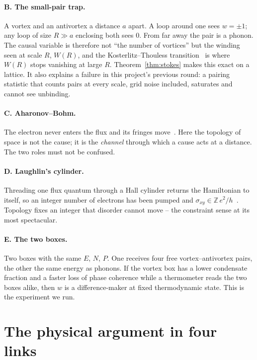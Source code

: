 \documentclass[11pt,a4paper]{article}
\begin{document}
\paragraph{B. The small-pair trap.} A vortex and an antivortex a distance $a$ apart. A loop around one
sees $w=\pm1$; any loop of size $R\gg a$ enclosing both sees $0$. From far away the pair is a
phonon. The causal variable is therefore not ``the number of vortices'' but the winding seen at scale
$R$, $W(R)$, and the Kosterlitz--Thouless transition~\cite{KosterlitzThouless1973} is where $W(R)$
stops vanishing at large $R$. Theorem~\ref{thm:stokes} makes this exact on a lattice. It also explains
a failure in this project's previous round: a pairing statistic that counts pairs at every scale,
grid noise included, saturates and cannot see unbinding.

\paragraph{C. Aharonov--Bohm.} The electron never enters the flux and its fringes
move~\cite{Tonomura1986}. Here the topology of space is not the cause; it is the \emph{channel}
through which a cause acts at a distance. The two roles must not be confused.

\paragraph{D. Laughlin's cylinder.} Threading one flux quantum through a Hall cylinder returns the
Hamiltonian to itself, so an integer number of electrons has been pumped and
$\sigma_{xy}\in\mathbb Z\,e^2/h$~\cite{Laughlin1981}. Topology fixes an integer that disorder cannot
move -- the constraint sense at its most spectacular.

\paragraph{E. The two boxes.} Two boxes with the same $E$, $N$, $P$. One receives four free
vortex--antivortex pairs, the other the same energy as phonons. If the vortex box has a lower
condensate fraction and a faster loss of phase coherence while a thermometer reads the two boxes
alike, then $w$ is a difference-maker at fixed thermodynamic state. This is the experiment we run.

\section{The physical argument in four links}\label{sec:physics}
\end{document}
